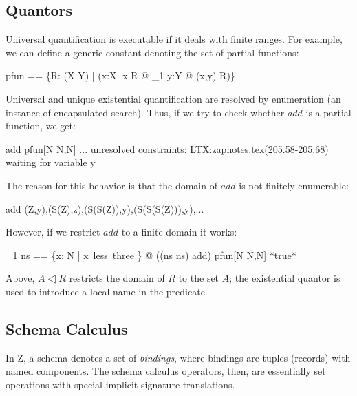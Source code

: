 \documentclass{article}
\begin{document}
\subsection{Quantors}\label{sec:quantors}

Universal quantification is executable if it deals with finite ranges.
For example, we can define a generic constant denoting the set of partial
functions:

\begin{axdef}[X,Y]
  pfun ==  
    \{R: \power(X \cross Y) | %
            (\forall x:X| x \in \dom R @ \exists_1 y:Y @ (x,y) \in R)\}
\end{axdef}

Universal and unique existential quantification are resolved by
enumeration (an instance of encapsulated search).  Thus, if we try to
check whether $add$ is a partial function, we get:

\begin{zexecpred}
  add \in pfun[N \cross N,N]
\yields
  ...
   unresolved constraints:
      LTX:zapnotes.tex(205.58-205.68) waiting for variable y
\end{zexecpred}

The reason for this behavior is that the domain of $add$ is not
finitely enumerable:

\begin{zexecpred}
  \dom add 
\yields
{(Z,y),(S(Z),z),(S(S(Z)),y),(S(S(S(Z))),y),...}
\end{zexecpred}

However, if we restrict $add$ to a finite domain it works:

\begin{zexecpred}
  \exists_1 ns == \{x: N | x~less~three \} @
  ((ns \cross ns) \dres add) \in pfun[N \cross N,N]
\yields
*true*
\end{zexecpred}

Above, $A \dres R$ restricts the domain of $R$ to the set $A$;
the existential quantor is used to introduce a local name in
the predicate.

\subsection{Schema Calculus}

In Z, a schema denotes a set of \emph{bindings}, where bindings are
tuples (records) with named components. The schema calculus operators,
then, are essentially set operations with special implicit signature
translations. 
\end{document}
